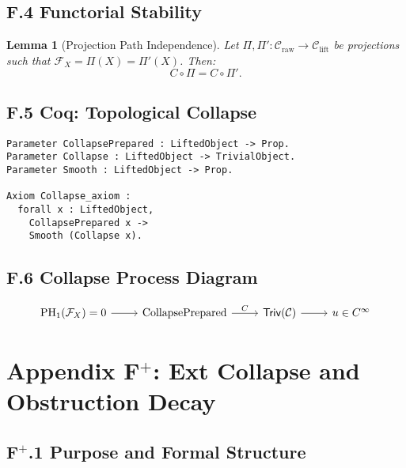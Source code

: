 \documentclass[11pt]{article}
\newtheorem{lemma}[theorem]{Lemma}
\begin{document}
\subsection*{F.4 Functorial Stability}

\begin{lemma}[Projection Path Independence]
Let \( \Pi, \Pi' : \mathcal{C}_{\mathrm{raw}} \to \mathcal{C}_{\mathrm{lift}} \) be projections such that \( \mathcal{F}_X = \Pi(X) = \Pi'(X) \). Then:
\[
C \circ \Pi = C \circ \Pi'.
\]
\end{lemma}

\subsection*{F.5 Coq: Topological Collapse}

\begin{lstlisting}[language=Coq, caption={Topological Collapse Structures}]
Parameter CollapsePrepared : LiftedObject -> Prop.
Parameter Collapse : LiftedObject -> TrivialObject.
Parameter Smooth : LiftedObject -> Prop.

Axiom Collapse_axiom :
  forall x : LiftedObject,
    CollapsePrepared x ->
    Smooth (Collapse x).
\end{lstlisting}

\subsection*{F.6 Collapse Process Diagram}

\[
\begin{tikzcd}
\mathrm{PH}_1(\mathcal{F}_X) = 0 \arrow[r] & \text{CollapsePrepared} \arrow[r, "C"] & \mathsf{Triv}(\mathcal{C}) \arrow[r] & u \in C^\infty
\end{tikzcd}
\]


\section*{Appendix F$^+$: Ext Collapse and Obstruction Decay}

\subsection*{F$^+$.1 Purpose and Formal Structure}
\end{document}
